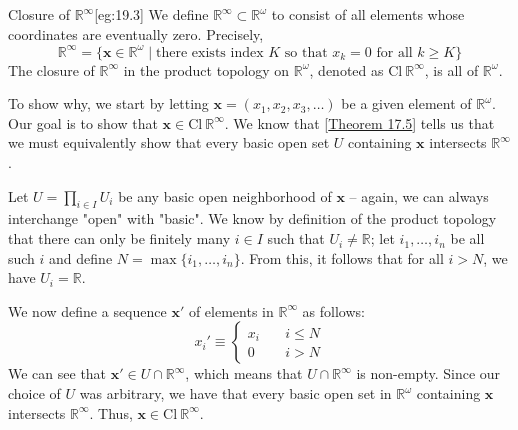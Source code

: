 \begin{egBox}{Closure of \( \mathbb{R}^{ \infty } \)}[eg:19.3]
    We define \( \mathbb{R}^{ \infty } \subset \mathbb{R}^{ \omega } \) to 
    consist of all elements whose coordinates are eventually zero.
    Precisely,
    \begin{equation*}
        \mathbb{R}^{ \infty }
        =
        \{
            \mathbf{x} \in \mathbb{R}^{ \omega }
            \mid 
            \text{there exists index } K \text{ so that } 
            x_{ k } = 0 \text{ for all } k \geq K
        \}
    \end{equation*}
    The closure of \( \mathbb{R}^{ \infty } \) in the product topology on 
    \( \mathbb{R}^{ \omega } \), denoted as \( \mathrm{Cl} \ 
    \mathbb{R}^{ \infty } \), is all of \( \mathbb{R}^{ \omega } \).

    \baseSkip

    To show why, we start by letting \( \mathbf{x} = ( x_{ 1 }, x_{ 2 }, 
    x_{ 3 }, \ldots ) \) be a given element of \( \mathbb{R}^{ \omega } \).
    Our goal is to show that \( \mathbf{x} \in \mathrm{Cl} \
    \mathbb{R}^{ \infty } \).
    We know that [\hyperlink{thm:17.5}{Theorem 17.5}] tells us that we must 
    equivalently show that every basic open set \( U \) containing 
    \( \mathbf{x} \) intersects \( \mathbb{R}^{ \infty } \).

    \baseSkip 

    Let \( U = \prod_{ i \in I } U_{ i } \) be any basic open neighborhood of 
    \( \mathbf{x} \) -- again, we can always interchange "open" with "basic".
    We know by definition of the product topology that there can only be 
    finitely many \( i \in I \) such that \( U_{ i } \neq \mathbb{R} \);
    let \( i_{ 1 } , \ldots , i_{ n } \) be all such \( i \) and define 
    \( N = \max \{ i_{ 1 } , \ldots , i_{ n } \} \).
    From this, it follows that for all \( i > N \), we have 
    \( U_{ i } = \mathbb{R} \).

    \baseSkip 

    We now define a sequence \( \mathbf{x}' \) of elements
    in \( \mathbb{R}^{ \infty } \) as follows:
    \begin{equation*}
        x_{ i }'
        \equiv 
        \begin{cases} 
            x_{ i } &\quad i \leq N
            \\
            0 &\quad i > N
        \end{cases}
    \end{equation*}
    We can see that \( \mathbf{x}' \in U \cap \mathbb{R}^{ \infty } \),
    which means that \( U \cap \mathbb{R}^{ \infty } \) is non-empty.
    Since our choice of \( U \) was arbitrary, we have that every basic open 
    set in \( \mathbb{R}^{ \omega } \) containing \( \mathbf{x} \) intersects
    \( \mathbb{R}^{ \infty } \).
    Thus, \( \mathbf{x} \in \mathrm{Cl} \ \mathbb{R}^{ \infty } \).


\end{egBox}
